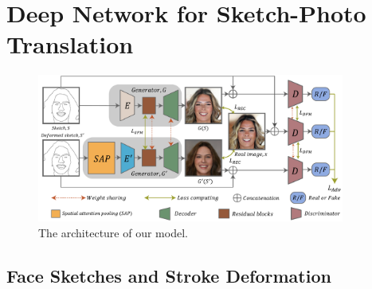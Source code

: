 
\section{Deep Network for Sketch-Photo Translation}
\label{sec:network}

\begin{figure}
	\includegraphics[width=0.9\textwidth]{figs/architecture}
	\caption{The architecture of our model.}
	\label{fig:architecture}
\end{figure}
%

%



\subsection{Face Sketches and Stroke Deformation}
\label{subsec:algorithm_data}



